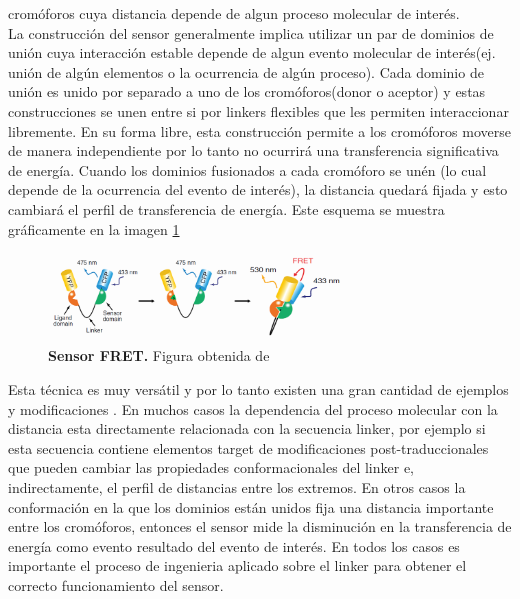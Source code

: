 \begin{itemize}
cromóforos cuya distancia depende de algun proceso molecular de interés. \\
La construcción del sensor generalmente implica utilizar un par de dominios de unión cuya interacción estable depende de algun evento molecular de interés(ej. unión de algún elementos o la ocurrencia de algún proceso).
Cada dominio de unión es unido por separado a uno de los cromóforos(donor o aceptor) y estas construcciones se unen entre si por linkers flexibles que les permiten interaccionar libremente.
En su forma libre, esta construcción permite a los cromóforos moverse de manera independiente por lo tanto no ocurrirá una transferencia significativa de energía. 
Cuando los dominios fusionados a cada cromóforo se unén (lo cual depende de la ocurrencia del evento de interés), la distancia quedará fijada y esto cambiará el perfil de transferencia de energía.
Este esquema se muestra gráficamente en la imagen \ref{fretSensor}


\begin{figure}[h]
\centering
\includegraphics[width=0.7\textwidth]{img/fret.png} 
\caption{\textbf{Sensor FRET.} Figura obtenida de \cite{crone2013gfp}}
\label{fretSensor}
\end{figure}

Esta técnica es muy versátil y por lo tanto existen una gran cantidad de ejemplos y modificaciones \cite{vinkenborg2009genetically,qiao2006zinc}. %
En muchos casos la dependencia del proceso molecular con la distancia esta directamente relacionada con la secuencia linker, 
por ejemplo si esta secuencia contiene elementos target de modificaciones post-traduccionales que pueden cambiar las propiedades conformacionales del linker e, indirectamente, el perfil de distancias entre los extremos. 
En otros casos la conformación en la que los dominios están unidos fija una distancia importante entre los cromóforos, entonces el sensor mide la disminución en la transferencia de energía como evento resultado del evento de interés.
En todos los casos es importante el proceso de ingenieria aplicado sobre el linker para obtener el correcto funcionamiento del sensor.



\end{itemize}
